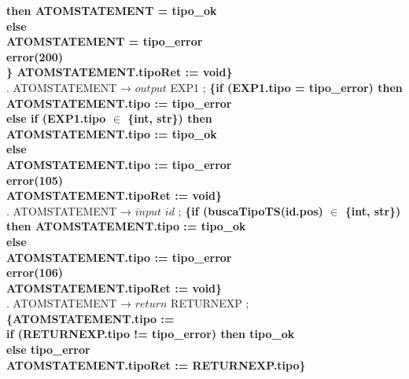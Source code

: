 \begin{tabbing}
    \>              \>          \>      \> \textbf{then ATOMSTATEMENT = tipo\_ok}\\
    \>              \>          \> \textbf{else}\\
    \>              \>          \>      \> \textbf{ATOMSTATEMENT = tipo\_error}\\
    \>              \>          \>      \> \textbf{error(200)}\\
    \>              \> \textbf{\} ATOMSTATEMENT.tipoRet := void\}}\\
    . ATOMSTATEMENT → $output$ EXP1 ; \textbf{\{if (EXP1.tipo = tipo\_error) then}\\
    \>              \>          \>      \>\textbf{ATOMSTATEMENT.tipo := tipo\_error}\\
    \>              \>          \>\textbf{ else if (EXP1.tipo $\in$ \{int, str\}) then}\\
    \>              \>          \>      \> \textbf{ATOMSTATEMENT.tipo := tipo\_ok}\\
    \>              \>          \>\textbf{else} \\
    \>              \>          \>      \> \textbf{ATOMSTATEMENT.tipo := tipo\_error}\\
    \>              \>          \>      \> \textbf{error(105)}\\
    \>              \>          \> \textbf{ATOMSTATEMENT.tipoRet := void\}}\\
    . ATOMSTATEMENT → $input$ $id$ ; \textbf{\{if (buscaTipoTS(id.pos) $\in$ \{int, str\})}\\
    \>              \>          \>\textbf{then ATOMSTATEMENT.tipo := tipo\_ok}\\
    \>              \> \textbf{else} \\
    \>              \>          \> \textbf{ATOMSTATEMENT.tipo := tipo\_error}\\
    \>              \>          \> \textbf{error(106)}\\
    \>              \> \textbf{ATOMSTATEMENT.tipoRet := void\}}\\
    . ATOMSTATEMENT → $return$ RETURNEXP ; \textbf{\{ATOMSTATEMENT.tipo :=}\\
    \>              \> \textbf{if (RETURNEXP.tipo != tipo\_error) then tipo\_ok}\\
    \>              \> \textbf{else tipo\_error}\\
    \>              \> \textbf{ATOMSTATEMENT.tipoRet := RETURNEXP.tipo\}}\\

\end{tabbing}
